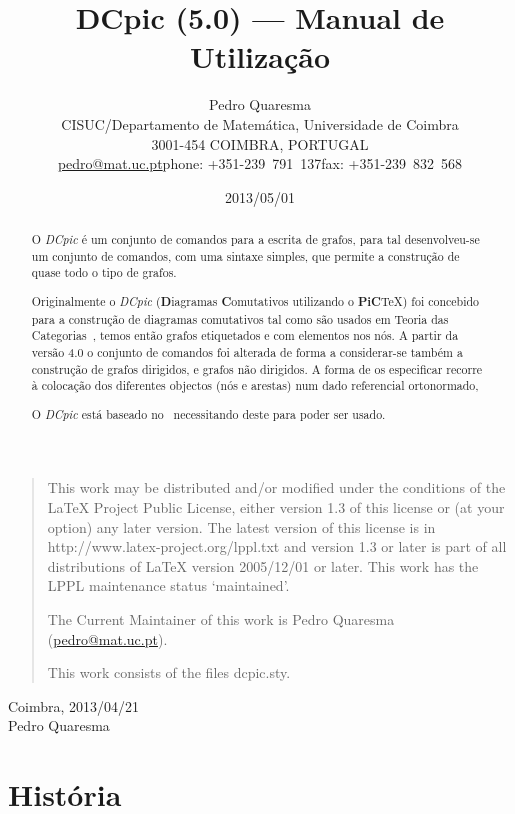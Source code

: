 \documentclass[a4paper,11pt]{article}
\title{DCpic (5.0) --- Manual de Utilização\\
\docversion}
\author{Pedro Quaresma\\ CISUC/Departamento de Matemática,
  Universidade de Coimbra\\ 3001-454 COIMBRA, PORTUGAL\\
    \url{pedro@mat.uc.pt}\quad phone: +351-239~791~137\quad fax:
  +351-239~832~568}
\date{2013/05/01}
\begin{document}
\maketitle

\begin{abstract}
 O {\em DCpic\/} é um conjunto de comandos para a escrita de grafos,
 para tal desenvolveu-se um conjunto de comandos, com uma sintaxe
 simples, que permite a construção de quase todo o tipo de grafos.

 Originalmente o {\em DCpic\/} ({\bf D}iagramas {\bf C}omutativos
 utilizando o {\bf PiC}TeX) foi concebido para a construção de
 diagramas comutativos tal como são usados em Teoria das
 Categorias~\cite{Herrlich73,Pierce98}, temos então grafos etiquetados
 e com elementos nos nós. A partir da versão 4.0 o conjunto de
 comandos foi alterada de forma a considerar-se também a construção de
 grafos dirigidos, e grafos não dirigidos. A forma de os especificar
 recorre à colocação dos diferentes objectos (nós e arestas) num dado
 referencial ortonormado,

 O {\em DCpic} está baseado no \PiCTeX\ necessitando deste para poder
 ser usado.
\end{abstract}

\vfill
\begin{quotation}
This work may be distributed and/or modified under the
conditions of the LaTeX Project Public License, either version 1.3
of this license or (at your option) any later version.
The latest version of this license is in
  http://www.latex-project.org/lppl.txt
and version 1.3 or later is part of all distributions of LaTeX
version 2005/12/01 or later.
This work has the LPPL maintenance status `maintained'.

The Current Maintainer of this work is Pedro Quaresma (\url{pedro@mat.uc.pt}).

This work consists of the files dcpic.sty.
\end{quotation}

\vspace*{2cm}
\noindent Coimbra, 2013/04/21\\
Pedro Quaresma

\pagebreak
\section{Hist\'oria}
\end{document}
